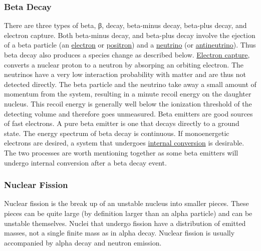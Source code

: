 \documentclass[12pt]{article}
\begin{document}
\begin{doublespacing}
\subsubsection{Beta Decay}
There are three types of beta, β, decay, beta-minus decay, beta-plus decay, and electron capture. Both beta-minus decay, and beta-plus decay involve the ejection of a beta particle (an \href{http://en.wikipedia.org/wiki/Electron}{electron} or \href{http://en.wikipedia.org/wiki/Positron}{positron}) and a \href{http://en.wikipedia.org/wiki/Neutrino}{neutrino} (or \href{http://en.wikipedia.org/wiki/Antineutrino#Antineutrinos}{antineutrino}). Thus beta decay also produces a species change as described below. \href{https://en.wikipedia.org/wiki/Electron_capture}{Electron capture}, converts a nuclear proton to a neutron by absorping an orbiting electron.
The neutrinos have a very low interaction probability with matter and are thus not detected directly. The beta particle and the neutrino take away a small amount of momentum from the system, resulting in a minute recoil energy on the daughter nucleus. This recoil energy is generally well below the ionization threshold of the detecting volume and therefore goes unmeasured.
Beta emitters are good sources of fast electrons. A pure beta emitter is one that decays directly to a ground state. The energy spectrum of beta decay is continuous. If monoenergetic electrons are desired, a system that undergoes \href{https://en.wikipedia.org/wiki/Internal_conversion}{internal conversion} is desirable. The two processes are worth mentioning together as some beta emitters will undergo internal conversion after a beta decay event.

\subsubsection{Nuclear Fission}
Nuclear fission is the break up of an unstable nucleus into smaller pieces. These pieces can be quite large (by definition larger than an alpha particle) and can be unstable themselves. Nuclei that undergo fission have a distribution of emitted masses, not a single finite mass as in alpha decay. Nuclear fission is usually accompanied by alpha decay and neutron emission.


\end{doublespacing}
\end{document}
